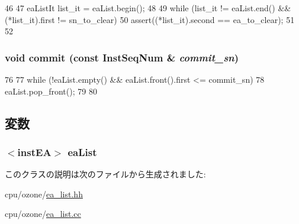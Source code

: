 \begin{DoxyCode}
46 {
47     eaListIt list_it = eaList.begin();
48 
49     while (list_it != eaList.end() && (*list_it).first != sn_to_clear) {
50         assert((*list_it).second == ea_to_clear);
51     }
52 }
\end{DoxyCode}
\hypertarget{classEAList_a640b6f8ad0650459d42a51d323f601c2}{
\subsubsection[{commit}]{\setlength{\rightskip}{0pt plus 5cm}void commit (const {\bf InstSeqNum} \& {\em commit\_\-sn})}}
\label{classEAList_a640b6f8ad0650459d42a51d323f601c2}



\begin{DoxyCode}
76 {
77     while (!eaList.empty() && eaList.front().first <= commit_sn) {
78         eaList.pop_front();
79     }
80 }
\end{DoxyCode}


\subsection{変数}
\hypertarget{classEAList_a22eb03f3c4b21316c6306cdb13be5669}{
\subsubsection[{eaList}]{$<${\bf instEA}$>$ {\bf eaList}}}
\label{classEAList_a22eb03f3c4b21316c6306cdb13be5669}


このクラスの説明は次のファイルから生成されました:\begin{DoxyCompactItemize}
\item 
cpu/ozone/\hyperlink{ea__list_8hh}{ea\_\-list.hh}\item 
cpu/ozone/\hyperlink{ea__list_8cc}{ea\_\-list.cc}\end{DoxyCompactItemize}
